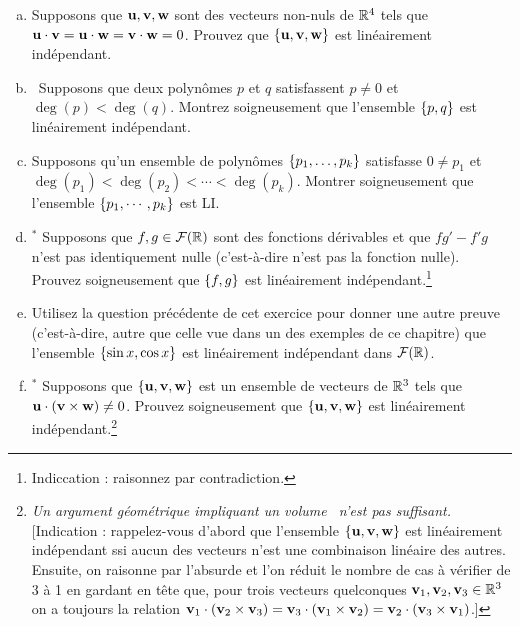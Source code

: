 \begin{prob}
\begin{enumerate}[a)]
\item Supposons que $\mathbf{u},\mathbf{v},\mathbf{w}$ sont des vecteurs non-nuls de $\mathbb{R}^4$ tels que
$\mathbf{u}\cdot \mathbf{v}= \mathbf{u}\cdot \mathbf{w}= \mathbf{v}\cdot \mathbf{w}=0$. Prouvez que $\{\mathbf{u},\mathbf{v},\mathbf{w}\}$ est linéairement indépendant. \medskip



\item\sov~Supposons que deux polynômes $p$ et $q$ satisfassent $p\not=0$ et $\deg(p) <\deg(q)$. Montrez soigneusement que l'ensemble $\{p,q\}$ est linéairement indépendant. \medskip
 



\item Supposons qu'un ensemble de polynômes $\{p_1, \dots, p_k\}$ satisfasse $0\not=p_1$ et $\deg(p_1) <\deg(p_2)< \cdots < \deg (p_k)$. Montrer soigneusement que l'ensemble $\{p_1, \cdots, p_k\}$ est LI. \medskip
 
\item$^\ast$ Supposons que $f,g \in \mathcal{F}(\mathbb{R})$ sont des fonctions dérivables et que $fg'-f'g $ n'est pas identiquement nulle (c'est-\`a-dire n'est pas la fonction nulle). Prouvez soigneusement que $\{f,g\}$ est linéairement indépendant.\footnote{ Indiccation : raisonnez par contradiction.}\medskip     
 
\item Utilisez la question précédente de cet exercice pour donner une autre preuve (c'est-à-dire, autre que celle vue dans un des exemples de ce chapitre) que l'ensemble $\{\sin x, \cos x\}$ est linéairement indépendant dans $\mathcal{F}(\mathbb{R})$.\medskip 
 
\item\sov$^\ast$ Supposons que $\{\mathbf{u},\mathbf{v},\mathbf{w}\}$ est un ensemble de vecteurs de $\mathbb{R}^3$ tels que $\mathbf{u}\cdot (\mathbf{v}\times \mathbf{w}) \not=0$. Prouvez soigneusement que $\{\mathbf{u},\mathbf{v},\mathbf{w}\}$ est linéairement indépendant.\footnote{ {\it Un argument géométrique impliquant un \og volume \fg\ n'est pas suffisant.} [Indication : rappelez-vous d'abord que l'ensemble $\{\mathbf{u},\mathbf{v},\mathbf{w}\}$ est linéairement indépendant ssi aucun des vecteurs n'est une combinaison linéaire des autres. Ensuite, on raisonne par l'absurde et l'on réduit le nombre de cas à vérifier de 3 à 1 en gardant en t\^ete que, pour trois vecteurs quelconques $\mathbf{v}_1, \mathbf{v}_2, \mathbf{v}_3 \in \mathbb{R}^3$ on a toujours la relation $\mathbf{v}_1\cdot (\mathbf{v}_2\times \mathbf{v}_3)=\mathbf{v}_3\cdot (\mathbf{v}_1\times \mathbf{v}_2)=\mathbf{v}_2\cdot (\mathbf{v}_3\times \mathbf{v}_1)$.]} 
\end{enumerate}
 \end{prob} 

